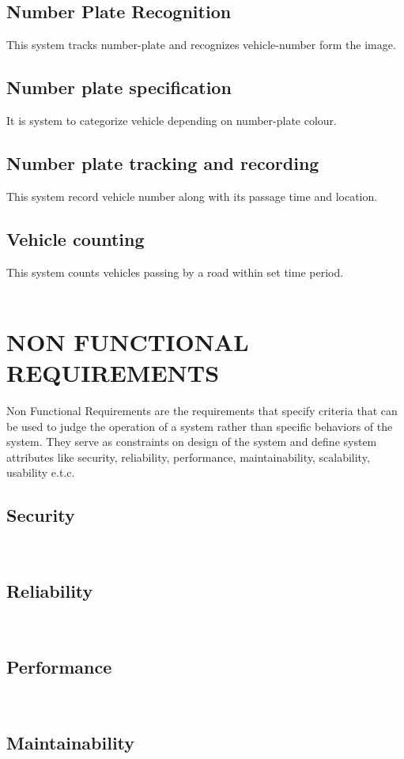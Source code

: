 \subsection{Number Plate Recognition}
This system tracks number-plate and recognizes vehicle-number form the image. 
\subsection{Number plate specification}
It is system to categorize vehicle depending on number-plate colour.

\subsection{Number plate tracking and recording}
This system record vehicle number along with its passage time and location.

\subsection{Vehicle counting}
This system counts vehicles passing by a road within set time period.\\\\

\section{NON FUNCTIONAL REQUIREMENTS}
Non Functional Requirements are the requirements that specify criteria that can be used to judge the operation of a system rather than specific behaviors of the system. They serve as constraints on design of the system and define system attributes like security, reliability, performance, maintainability, scalability, usability e.t.c.
\subsection{Security}
\lipsum[1]\\
\subsection{Reliability}
\lipsum[1]\\
\subsection{Performance}
\lipsum[1]\\
\subsection{Maintainability}
\lipsum[1]\\

